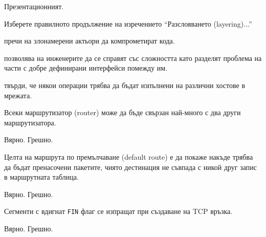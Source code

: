 \begin{questions}
\begin{oneparchoices}
    \choice Презентационният.
  \end{oneparchoices}

  \question[6] Изберете правилното продължение на изречението "`Разслояването
  (\foreignlanguage{english}{layering})..."'
  \begin{choices}
    \choice пречи на злонамерени актьори да компрометират кода.

    \choice позволява на инженерите да се справят със сложността като
    разделят проблема на части с добре дефинирани интерфейси помежду им.

    \choice твърди, че някои операции трябва да бъдат изпълнени на различни
    хостове в мрежата.
  \end{choices}

  \question[6] Всеки маршрутизатор (\foreignlanguage{english}{router}) може да бъде свързан най-много с два други
  маршрутизатора.
  \begin{oneparchoices}
    \choice Вярно.
    \CorrectChoice Грешно.
  \end{oneparchoices}

  \question[6] Целта на маршрута по премълчаване
  (\foreignlanguage{english}{default route}) е да покаже накъде трябва да бъдат
  пренасочени пакетите, чиято дестинация не съвпада с никой друг запис в
  маршрутната таблица.
  \begin{oneparchoices}
    \CorrectChoice Вярно.
    \choice Грешно.
  \end{oneparchoices}

  \question[6] Сегменти с вдигнат \texttt{FIN} флаг се изпращат при създаване на
  TCP връзка.
  \begin{oneparchoices}
    \choice Вярно.
    \CorrectChoice Грешно.
  \end{oneparchoices}
\end{questions}

